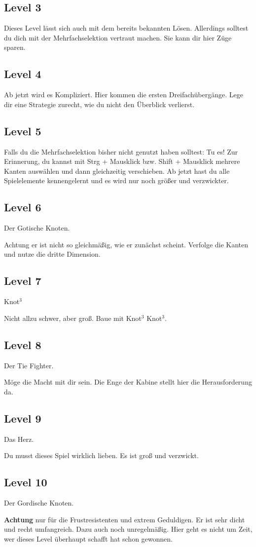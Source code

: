 \documentclass{scrartcl}
\begin{document}
\subsection*{Level 3}
Dieses Level lässt sich auch mit dem bereits bekannten Lösen. Allerdings solltest du dich mit der Mehrfachselektion vertraut machen. Sie kann dir hier Züge sparen.

\subsection*{Level 4}
Ab jetzt wird es Kompliziert. Hier kommen die ersten Dreifachübergänge. Lege dir eine Strategie zurecht, wie du nicht den Überblick verlierst.

\subsection*{Level 5}
Falls du die Mehrfachselektion bisher nicht genutzt haben solltest: Tu es!
Zur Erinnerung, du kannst mit Strg + Mausklick bzw. Shift + Mausklick mehrere Kanten auswählen und dann gleichzeitig verschieben.
Ab jetzt hast du alle Spielelemente kennengelernt und es wird nur noch größer und verzwickter.

\subsection*{Level 6}
Der Gotische Knoten.

Achtung er ist nicht so gleichmäßig, wie er zunächst scheint. Verfolge die Kanten und nutze die dritte Dimension.

\subsection*{Level 7}
Knot$^3$

Nicht allzu schwer, aber groß. Baue mit Knot$^3$ Knot$^3$.

\subsection*{Level 8}
Der Tie Fighter.

Möge die Macht mit dir sein. Die Enge der Kabine stellt hier die Herausforderung da.

\subsection*{Level 9}
Das Herz.

Du musst dieses Spiel wirklich lieben. Es ist groß und verzwickt.

\subsection*{Level 10}
Der Gordische Knoten.

{\bf Achtung} nur für die Frustresistenten und extrem Geduldigen. Er ist sehr dicht und recht umfangreich. Dazu auch noch unregelmäßig. Hier geht es nicht um Zeit, wer dieses Level überhaupt schafft hat schon gewonnen.
\end{document}
